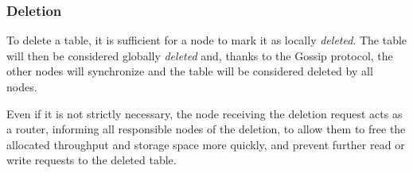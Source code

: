 \subsubsection{Deletion}
\label{subsubsec:deletion}

To delete a table, it is sufficient for a node to mark it as locally
\emph{deleted}.
The table will then be considered globally \emph{deleted} and, thanks to the
Gossip protocol, the other nodes will synchronize and the table will be
considered deleted by all nodes.

Even if it is not strictly necessary, the node receiving the deletion request
acts as a router, informing all responsible nodes of the deletion, to allow
them to free the allocated throughput and storage space more quickly, and
prevent further read or write requests to the deleted table.
